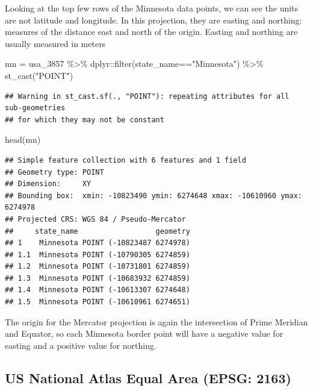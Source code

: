 \documentclass[
]{book}
\newenvironment{Shaded}{\begin{snugshade}}{\end{snugshade}}
\newcommand{\FunctionTok}[1]{\textcolor[rgb]{0.00,0.00,0.00}{#1}}
\newcommand{\NormalTok}[1]{#1}
\newcommand{\OtherTok}[1]{\textcolor[rgb]{0.56,0.35,0.01}{#1}}
\newcommand{\SpecialCharTok}[1]{\textcolor[rgb]{0.00,0.00,0.00}{#1}}
\newcommand{\StringTok}[1]{\textcolor[rgb]{0.31,0.60,0.02}{#1}}
\begin{document}
Looking at the top few rows of the Minnesota data points, we can see the units are not latitude and longitude. In this projection, they are easting and northing: measures of the distance east and north of the origin. Easting and northing are usually measured in meters

\begin{Shaded}
\begin{Highlighting}[]
\NormalTok{mn }\OtherTok{=}\NormalTok{ usa\_3857 }\SpecialCharTok{\%\textgreater{}\%}
\NormalTok{  dplyr}\SpecialCharTok{::}\FunctionTok{filter}\NormalTok{(state\_name}\SpecialCharTok{==}\StringTok{"Minnesota"}\NormalTok{) }\SpecialCharTok{\%\textgreater{}\%}
  \FunctionTok{st\_cast}\NormalTok{(}\StringTok{"POINT"}\NormalTok{)}
\end{Highlighting}
\end{Shaded}

\begin{verbatim}
## Warning in st_cast.sf(., "POINT"): repeating attributes for all sub-geometries
## for which they may not be constant
\end{verbatim}

\begin{Shaded}
\begin{Highlighting}[]
\FunctionTok{head}\NormalTok{(mn)}
\end{Highlighting}
\end{Shaded}

\begin{verbatim}
## Simple feature collection with 6 features and 1 field
## Geometry type: POINT
## Dimension:     XY
## Bounding box:  xmin: -10823490 ymin: 6274648 xmax: -10610960 ymax: 6274978
## Projected CRS: WGS 84 / Pseudo-Mercator
##     state_name                  geometry
## 1    Minnesota POINT (-10823487 6274978)
## 1.1  Minnesota POINT (-10790305 6274859)
## 1.2  Minnesota POINT (-10731801 6274859)
## 1.3  Minnesota POINT (-10683932 6274859)
## 1.4  Minnesota POINT (-10613307 6274648)
## 1.5  Minnesota POINT (-10610961 6274651)
\end{verbatim}

The origin for the Mercator projection is again the intersection of Prime Meridian and Equator, so each Minnesota border point will have a negative value for easting and a positive value for northing.

\hypertarget{us-national-atlas-equal-area-epsg-2163}{%
\subsection{US National Atlas Equal Area (EPSG: 2163)}\label{us-national-atlas-equal-area-epsg-2163}}
\end{document}
